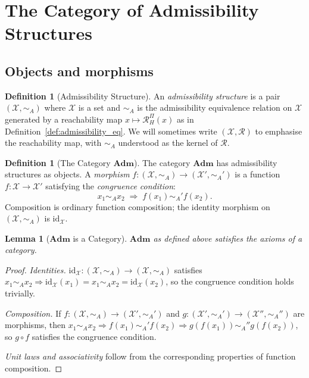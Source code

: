 \documentclass[11pt, a4paper]{article}
\theoremstyle{plain}
\newtheorem{lemma}[theorem]{Lemma}
\theoremstyle{definition}
\newtheorem{definition}[theorem]{Definition}
\theoremstyle{remark}
\newcommand{\calX}{\mathcal{X}}
\newcommand{\calR}{\mathcal{R}}
\newcommand{\simA}{\sim_{\!A}}
\newcommand{\RHP}{\mathcal{R}_{H}^{\Pi}}
\newcommand{\Adm}{\mathbf{Adm}}
\newcommand{\id}{\mathrm{id}}
\begin{document}
\section{The Category of Admissibility Structures}
\label{sec:cat}

\subsection{Objects and morphisms}

\begin{definition}[Admissibility Structure]
\label{def:struct}
An \emph{admissibility structure} is a pair $(\calX, \simA)$ where $\calX$
is a set and $\simA$ is the admissibility equivalence relation on $\calX$
generated by a reachability map $x \mapsto \RHP(x)$ as in
Definition~\ref{def:admissibility_eq}. We will sometimes write $(\calX,
\calR)$ to emphasise the reachability map, with $\simA$ understood as the
kernel of $\calR$.
\end{definition}

\begin{definition}[The Category $\Adm$]
\label{def:adm}
The category $\Adm$ has admissibility structures as objects. A
\emph{morphism} $f\colon (\calX, \simA) \to (\calX', \simA')$ is a function
$f\colon \calX \to \calX'$ satisfying the \emph{congruence condition}:
\[
  x_1 \simA x_2 \;\Longrightarrow\; f(x_1) \simA' f(x_2).
\]
Composition is ordinary function composition; the identity morphism on
$(\calX, \simA)$ is $\id_\calX$.
\end{definition}

\begin{lemma}[$\Adm$ is a Category]
\label{lem:category}
$\Adm$ as defined above satisfies the axioms of a category.
\end{lemma}

\begin{proof}
\emph{Identities.} $\id_\calX\colon (\calX, \simA) \to (\calX, \simA)$
satisfies $x_1 \simA x_2 \Rightarrow \id_\calX(x_1) = x_1 \simA x_2 =
\id_\calX(x_2)$, so the congruence condition holds trivially.

\emph{Composition.} If $f\colon (\calX, \simA) \to (\calX', \simA')$ and
$g\colon (\calX', \simA') \to (\calX'', \simA'')$ are morphisms, then
$x_1 \simA x_2 \Rightarrow f(x_1) \simA' f(x_2) \Rightarrow g(f(x_1))
\simA'' g(f(x_2))$, so $g \circ f$ satisfies the congruence condition.

\emph{Unit laws and associativity} follow from the corresponding properties
of function composition.
\end{proof}
\end{document}

